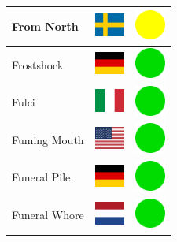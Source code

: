 \documentclass[12pt, a4paper, twoside]{report}
\begin{document}
\begin{center}
\begin{longtable}{|p{5cm}|p{2cm}|p{2cm}|}
 From North                                                 & \includegraphics[width=1cm]{../img/flags/se} &   \includegraphics[width=1cm]{../likes/m} \\ \hline
 Frostshock                                                 & \includegraphics[width=1cm]{../img/flags/de} &   \includegraphics[width=1cm]{../likes/y} \\ \hline
 Fulci                                                      & \includegraphics[width=1cm]{../img/flags/it} &   \includegraphics[width=1cm]{../likes/y} \\ \hline
 Fuming Mouth                                               & \includegraphics[width=1cm]{../img/flags/us} &   \includegraphics[width=1cm]{../likes/y} \\ \hline
 Funeral Pile                                               & \includegraphics[width=1cm]{../img/flags/de} &   \includegraphics[width=1cm]{../likes/y} \\ \hline
 Funeral Whore                                              & \includegraphics[width=1cm]{../img/flags/nl} &   \includegraphics[width=1cm]{../likes/y} \\ \hline

\end{longtable}
\end{center}
\end{document}
